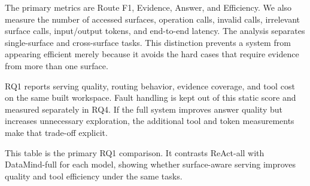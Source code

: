 The primary metrics are Route F1, Evidence, Answer, and Efficiency. We also
measure the number of accessed surfaces, operation calls, invalid calls,
irrelevant surface calls, input/output tokens, and end-to-end latency. The
analysis separates single-surface and cross-surface tasks. This distinction
prevents a system from appearing efficient merely because it avoids the hard
cases that require evidence from more than one surface.

RQ1 reports serving quality, routing behavior, evidence coverage, and tool
cost on the same built workspace. Fault handling is kept out of this static
score and measured separately in RQ4. If the full system improves answer
quality but increases unnecessary exploration, the additional tool and token
measurements make that trade-off explicit.

This table is the primary RQ1 comparison. It contrasts ReAct-all with DataMind-full for each model, showing whether surface-aware serving improves quality and tool efficiency under the same tasks.

\begin{table}[t]
\centering\footnotesize
\setlength{\tabcolsep}{3.5pt}
\caption{RQ1 main serving results on WorkSurface-Bench.}
\label{tab:rq1-main}
\scriptsize
\setlength{\tabcolsep}{4pt}
\end{table}

